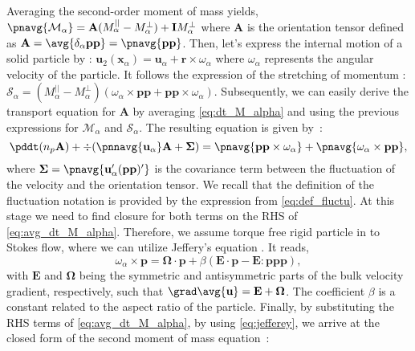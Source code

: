 Averaging the second-order moment of mass yields, $\pnavg{\mathcal{M}_\alpha} =  \textbf{A} (M_\alpha^{||} - M_\alpha^\bot) +  \textbf{I} M_\alpha^\bot$ where $\textbf{A}$ is the orientation tensor defined as $\textbf{A} = \avg{\delta_\alpha\textbf{pp}} = \pnavg{\textbf{pp}}$.
Then, let's express the internal motion of a solid particle by : $\textbf{u}_2(\textbf{x}_\alpha) = \textbf{u}_\alpha + \textbf{r}\times \omega_\alpha$ where $\omega_\alpha$ represents the angular velocity of the particle.
It follows the expression of the stretching of momentum : $\mathcal{S}_\alpha = (M_\alpha^{||} - M_\alpha^\bot) \left(
    \omega_\alpha \times
    \textbf{pp}
    + \textbf{pp} \times \omega_\alpha
\right)$. 
Subsequently,  we can easily derive the transport equation for $\textbf{A}$ by averaging \ref{eq:dt_M_alpha} and using the previous expressions for $\mathcal{M}_\alpha$ and $\mathcal{S}_\alpha$.
The resulting equation is given by~:
\begin{equation}
    \pddt (n_p\textbf{A})
    + \div (
        \pnnavg{\textbf{u}_\alpha}\textbf{A}
        + \mathbf{\Sigma}
        )
    =
    \pnavg{\textbf{pp} \times \omega_\alpha}
    + \pnavg{\omega_\alpha \times \textbf{pp}},
    \label{eq:avg_dt_M_alpha}
\end{equation}
where $\mathbf{\Sigma} = \pnavg{\textbf{u}'_\alpha(\textbf{pp})'}$ is the covariance term between the fluctuation of the velocity and the orientation tensor.
We recall that the definition of the fluctuation notation is provided by the expression from \ref{eq:def_fluctu}.
At this stage we need to find closure for both terms on the RHS of \ref{eq:avg_dt_M_alpha}. 
Therefore, we assume torque free rigid particle in to Stokes flow, where we can utilize Jeffery's equation \citep{guazzelli2011}.
It reads,
\begin{equation}
    \omega_\alpha \times \textbf{p}
    = \mathbf{\Omega}\cdot\textbf{p}
    + \beta\left(
        \textbf{E}\cdot \textbf{p}
        - \textbf{E} : \textbf{ppp}
    \right),
    \label{eq:jefferey}
\end{equation}
with $\textbf{E}$ and $\mathbf{\Omega}$ being the symmetric and antisymmetric parts of the bulk velocity gradient, respectively, such that $\grad\avg{\textbf{u}}=\textbf{E}+\mathbf{\Omega}$.
The coefficient $\beta$  is a constant related to the aspect ratio of the particle.
Finally, by substituting the RHS terms of \ref{eq:avg_dt_M_alpha}, by using \ref{eq:jefferey}, we arrive at the closed form of the second moment of mass equation~:
